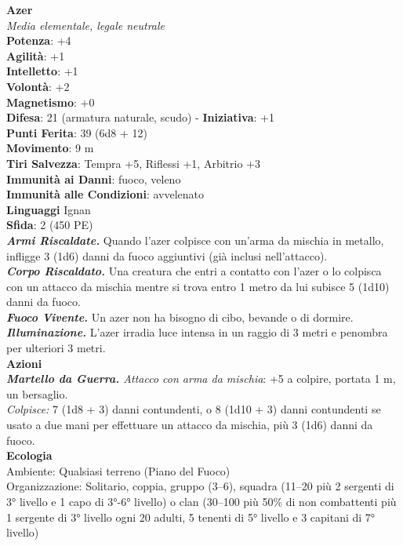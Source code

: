 \begin{multicols}{2}
\medskip\textbf{Azer}\\
\emph{Media elementale, legale neutrale}\\
\textbf{Potenza}: +4\\
\textbf{Agilità}: +1\\
\textbf{Intelletto}: +1\\
\textbf{Volontà}: +2\\
\textbf{Magnetismo}: +0\\
\textbf{Difesa}: 21 (armatura naturale, scudo) - \textbf{Iniziativa}: +1\\
\textbf{Punti Ferita}: 39 (6d8 + 12)\\
\textbf{Movimento}: 9 m\\
\textbf{Tiri Salvezza}: Tempra +5, Riflessi +1, Arbitrio +3\\
\textbf{Immunità ai Danni}: fuoco, veleno\\
\textbf{Immunità alle Condizioni}: avvelenato\\
\textbf{Linguaggi} Ignan\\
\textbf{Sfida}: 2 (450 PE)\smallskip\\
\emph{\textbf{Armi Riscaldate.}} Quando l'azer colpisce con un'arma da mischia in metallo, infligge 3 (1d6) danni da fuoco aggiuntivi (già inclusi nell'attacco).\\
\emph{\textbf{Corpo Riscaldato.}} Una creatura che entri a contatto con l'azer o lo colpisca con un attacco da mischia mentre si trova entro 1 metro da lui subisce 5 (1d10) danni da fuoco.\\
\emph{\textbf{Fuoco Vivente.}} Un azer non ha bisogno di cibo, bevande o di dormire.\\
\emph{\textbf{Illuminazione.}} L'azer irradia luce intensa in un raggio di 3 metri e penombra per ulteriori 3 metri.\\
\smallskip\textbf{Azioni}\\
\emph{\textbf{Martello da Guerra.} Attacco con arma da mischia}: +5 a colpire, portata 1 m, un bersaglio.\\
\emph{Colpisce:} 7 (1d8 + 3) danni contundenti, o 8 (1d10 + 3) danni contundenti se usato a due mani per effettuare un attacco da mischia, più 3 (1d6) danni da fuoco.\\
\textbf{Ecologia}\\
Ambiente: Qualsiasi terreno (Piano del Fuoco)\\
Organizzazione: Solitario, coppia, gruppo (3–6), squadra (11–20 più 2 sergenti di 3° livello e 1 capo di 3°-6° livello) o clan (30–100 più 50\% di non combattenti più 1 sergente di 3° livello ogni 20 adulti, 5 tenenti di 5° livello e 3 capitani di 7° livello)\\

\end{multicols}
